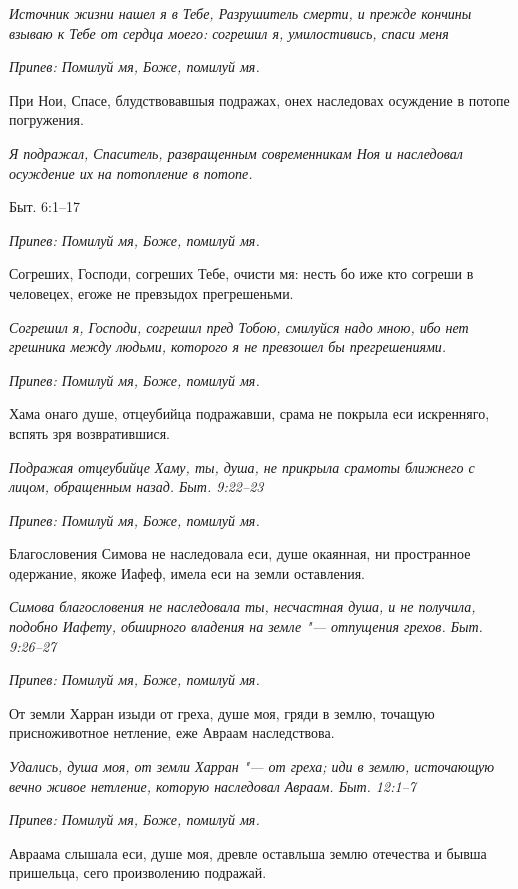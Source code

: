 \itshape Источник жизни нашел я в Тебе, Разрушитель смерти, и прежде кончины взываю к Тебе от сердца моего: согрешил я, умилостивись, спаси меня\normalfont{}


\itshape Припев:\normalfont{} Помилуй мя, Боже, помилуй мя.


При Нои, Спасе, блудствовавшыя подражах, онех наследовах осуждение в потопе погружения.


\itshape Я подражал, Спаситель, развращенным современникам Ноя и наследовал осуждение их на потопление в потопе.


Быт. 6:1–17\normalfont{}


\itshape Припев:\normalfont{} Помилуй мя, Боже, помилуй мя.


Согреших, Господи, согреших Тебе, очисти мя: несть бо иже кто согреши в человецех, егоже не превзыдох прегрешеньми.


\itshape Согрешил я, Господи, согрешил пред Тобою, смилуйся надо мною, ибо нет грешника между людьми, которого я не превзошел бы прегрешениями.\normalfont{}


\itshape Припев:\normalfont{} Помилуй мя, Боже, помилуй мя.


Хама онаго душе, отцеубийца подражавши, срама не покрыла еси искренняго, вспять зря возвратившися.


\itshape Подражая отцеубийце Хаму, ты, душа, не прикрыла срамоты ближнего с лицом, обращенным назад. Быт. 9:22–23\normalfont{}


\itshape Припев:\normalfont{} Помилуй мя, Боже, помилуй мя.


Благословения Симова не наследовала еси, душе окаянная, ни пространное одержание, якоже Иафеф, имела еси на земли оставления.


\itshape Симова благословения не наследовала ты, несчастная душа, и не получила, подобно Иафету, обширного владения на земле "--- отпущения грехов. Быт. 9:26–27\normalfont{}


\itshape Припев:\normalfont{} Помилуй мя, Боже, помилуй мя.


От земли Харран изыди от греха, душе моя, гряди в землю, точащую присноживотное нетление, еже Авраам наследствова.


\itshape Удались, душа моя, от земли Харран "--- от греха; иди в землю, источающую вечно живое нетление, которую наследовал Авраам. Быт. 12:1–7\normalfont{}


\itshape Припев:\normalfont{} Помилуй мя, Боже, помилуй мя.


Авраама слышала еси, душе моя, древле оставльша землю отечества и бывша пришельца, сего произволению подражай.


